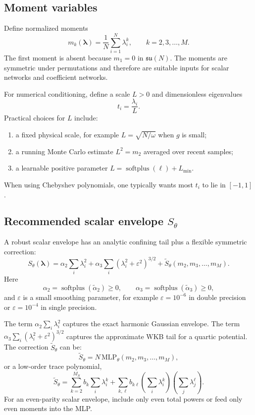 \documentclass[11pt]{article}
\newcommand{\su}{\mathfrak{su}}
\newcommand{\softplus}{\operatorname{softplus}}
\newcommand{\eps}{\varepsilon}
\begin{document}
\subsection{Moment variables}

Define normalized moments
\begin{equation}
 m_k(\bm\lambda)=\frac1N\sum_{i=1}^N\lambda_i^k,
 \qquad k=2,3,\ldots,M.
\end{equation}
The first moment is absent because $m_1=0$ in $\su(N)$.  The moments are symmetric under permutations and therefore are suitable inputs for scalar networks and coefficient networks.

For numerical conditioning, define a scale $L>0$ and dimensionless eigenvalues
\begin{equation}
 t_i=\frac{\lambda_i}{L}.
\end{equation}
Practical choices for $L$ include:
\begin{enumerate}[label=(\alph*)]
\item a fixed physical scale, for example $L=\sqrt{N/\omega}$ when $g$ is small;
\item a running Monte Carlo estimate $L^2=m_2$ averaged over recent samples;
\item a learnable positive parameter $L=\softplus(\ell)+L_{\min}$.
\end{enumerate}
When using Chebyshev polynomials, one typically wants most $t_i$ to lie in $[-1,1]$.

\subsection{Recommended scalar envelope $S_\theta$}

A robust scalar envelope has an analytic confining tail plus a flexible symmetric correction:
\begin{equation}
\boxed{
S_\theta(\bm\lambda)
=\alpha_2\sum_i\lambda_i^2
+\alpha_3\sum_i(\lambda_i^2+\eps^2)^{3/2}
+\widetilde S_\theta(m_2,m_3,\ldots,m_M).
}
\label{eq:S_theta_recommended}
\end{equation}
Here
\begin{equation}
\alpha_2=\softplus(\tilde\alpha_2)\geq0,
\qquad
\alpha_3=\softplus(\tilde\alpha_3)\geq0,
\end{equation}
and $\eps$ is a small smoothing parameter, for example $\eps=10^{-6}$ in double precision or $\eps=10^{-4}$ in single precision.

The term $\alpha_2\sum_i\lambda_i^2$ captures the exact harmonic Gaussian envelope.  The term $\alpha_3\sum_i(\lambda_i^2+\eps^2)^{3/2}$ captures the approximate WKB tail for a quartic potential.  The correction $\widetilde S_\theta$ can be:
\begin{equation}
\widetilde S_\theta=N\,\mathrm{MLP}_\theta(m_2,m_3,\ldots,m_M),
\end{equation}
or a low-order trace polynomial,
\begin{equation}
\widetilde S_\theta=\sum_{k=2}^{M_S}b_k\sum_i\lambda_i^k
+\sum_{k,\ell}b_{k\ell}\left(\sum_i\lambda_i^k\right)
\left(\sum_j\lambda_j^\ell\right).
\end{equation}
For an even-parity scalar envelope, include only even total powers or feed only even moments into the MLP.
\end{document}
